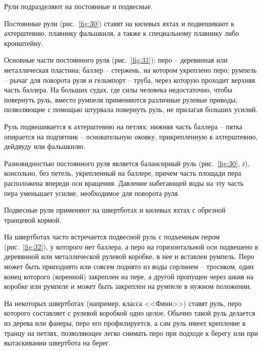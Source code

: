 \documentclass[a4paper, 12pt, twoside, final]{scrbook}
\begin{document}
Рули подразделяют на постоянные и подвесные.

Постоянные рули (рис.~\ref{fig:30})
ставят на килевых яхтах и подвешивают к ахтерштевню, плавнику фальшкиля,
а также к специальному плавнику либо кронштейну.

Основные части постоянного руля (рис.~\ref{fig:31}):
перо \--- деревянная или металлическая пластина; баллер \--- стержень, на
котором укреплено перо; румпель \--- рычаг для поворота руля и гельмпорт
\--- труба, через которую проходит верхняя часть баллера. На больших
судах, где силы человека недостаточно, чтобы повернуть руль, вместо
румпеля применяются различные рулевые приводы, позволяющие с помощью
штурвала повернуть руль, не прилагая больших усилий.{\sloppy\par}

Руль подвешивается к ахтерштевню на петлях; нижняя часть баллера \---
пятка опирается на подпятник \--- основательную оковку, прикрепленную к
ахтерштевню, дейдвуду или фальшкилю.

Разновидностью постоянного руля является балансирный руль (рис.~\ref{fig:30},
\emph{г}), консольно, без петель, укрепленный на баллере, причем часть
площади пера расположена впереди оси вращения. Давление набегающей
воды на эту часть пера уменьшает усилие, необходимое для поворота
руля.

Подвесные рули применяют на швертботах и килевых яхтах с обрезной
транцевой кормой.

На швертботах часто встречается подвесной руль с подъемным пером (рис.~\ref{fig:32}),
у которого нет баллера, а перо на горизонтальной оси подвешено в деревянной
или металлической рулевой коробке, в нее и вставлен румпель. Перо
может быть приподнято или совсем поднято из воды сорлинем \--- тросиком,
один конец которого (коренной) закреплен на пере, а другой пропущен
через шкив на коробке или румпеле и может быть закреплен на румпеле
в нужном положении.

На некоторых швертботах (например, класса <<Финн>>) ставят руль, перо
которого составляет с рулевой коробкой одно целое. Обычно такой руль
делается из дерева или фанеры, перо его профилируется, а сам руль
имеет крепление к транцу на петлях, позволяющее легко снимать перо
при подходе к берегу или при вытаскивании швертбота на берег.
\end{document}
